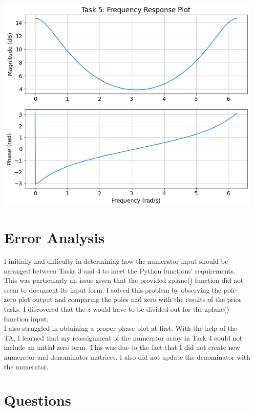 \documentclass[12pt]{report}
\begin{document}
\begin{center}
	\includegraphics[scale = 0.56]{Lab 11 - Plots/Task5.png}\\[0.5 cm]
\end{center}

\section{Error Analysis}

I initially had difficulty in determining how the numerator input should be arranged between Tasks 3 and 4 to meet the Python functions' requirements. This was particularly an issue given that the provided zplane() function did not seem to document its input form. I solved this problem by observing the pole-zero plot output and comparing the poles and zero with the results of the prior tasks. I discovered that the $ z $ would have to be divided out for the zplane() function input. \\

I also struggled in obtaining a proper phase plot at first. With the help of the TA, I learned that my reassignment of the numerator array in Task 4 could not include an initial zero term. This was due to the fact that I did not create new numerator and denominator matrices. I also did not update the denominator with the numerator. \\

\section{Questions}
\end{document}
